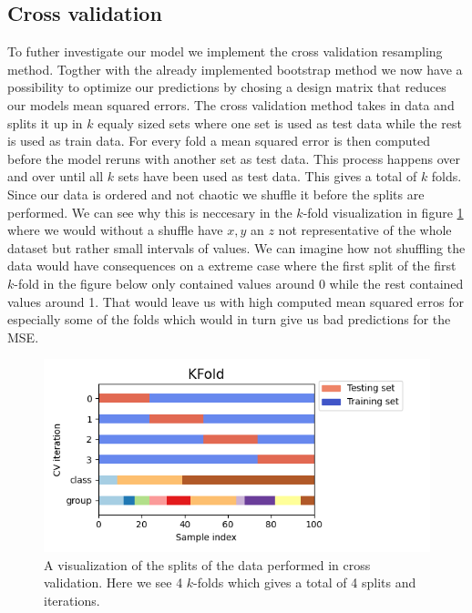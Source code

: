 \documentclass[12pt]{article}
\begin{document}
\subsection{Cross validation}
To futher investigate our model we implement the cross validation resampling method. Togther with the already implemented bootstrap method we now have a possibility to optimize our predictions by chosing a design matrix that reduces our models mean squared errors. The cross validation method takes in data and splits it up in $k$ equaly sized sets where one set is used as test data while the rest is used as train data. For every fold a mean squared error is then computed before the model reruns with another set as test data. This process happens over and over until all $k$ sets have been used as test data. This gives a total of $k$ folds. Since our data is ordered and not chaotic we shuffle it before the splits are performed. We can see why this is neccesary in the $k$-fold visualization in figure \ref{fig:k_fold} where we would without a shuffle have $x,y$ an $z$ not representative of the whole dataset but rather small intervals of values. We can imagine how not shuffling the data would have consequences on a extreme case where the first split of the first $k$-fold in the figure below only contained values around 0 while the rest contained values around 1. That would leave us with high computed mean squared erros for especially some of the folds which would in turn give us bad predictions for the MSE.
\begin{figure}[H]
  \centering
  \includegraphics[width=.7\textwidth]{../figures/cv_kfold.png}
  \caption{A visualization of the splits of the data performed in cross validation. Here we see 4 $k$-folds which gives a total of 4 splits and iterations. \cite{cv}}
  \label{fig:k_fold}
\end{figure}
\end{document}

